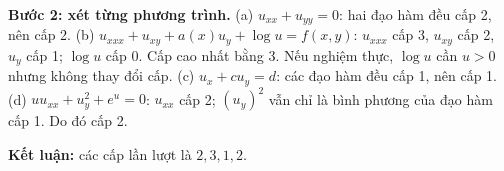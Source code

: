 \documentclass[10pt,a4paper]{article}
\begin{document}
\textbf{Bước 2: xét từng phương trình.}
(a) $u_{xx}+u_{yy}=0$: hai đạo hàm đều cấp 2, nên cấp 2.
(b) $u_{xxx}+u_{xy}+a(x)u_y+\log u=f(x,y)$: $u_{xxx}$ cấp 3, $u_{xy}$ cấp 2, $u_y$ cấp 1; $\log u$ cấp 0. Cấp cao nhất bằng 3. Nếu nghiệm thực, $\log u$ cần $u>0$ nhưng không thay đổi cấp.
(c) $u_x+cu_y=d$: các đạo hàm đều cấp 1, nên cấp 1.
(d) $uu_{xx}+u_y^2+e^u=0$: $u_{xx}$ cấp 2; $(u_y)^2$ vẫn chỉ là bình phương của đạo hàm cấp 1. Do đó cấp 2.

\textbf{Kết luận:} các cấp lần lượt là $\boxed{2,3,1,2}$.
\end{document}
